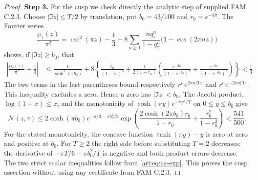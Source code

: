 \begin{proof}
\noindent\textbf{Step 3.} For the cusp we check directly the analytic step of supplied FAM C.2.3.
Choose $|\Im z|\le T/2$ by translation, put $b_0=43/100$ and
$r_0=e^{-4\pi}$. The Fourier series
\[
 \frac{\wp_\tau(z)}{\pi^2}
 =\csc^2(\pi z)-\frac13
   +8\sum_{n\ge1}\frac{nq_\tau^n}{1-q_\tau^n}
          \bigl(1-\cos(2\pi nz)\bigr)
\]
shows, if $|\Im z|\ge b_0$, that
\begin{align*}
 \left|\frac{\wp_\tau(z)}{\pi^2}+\frac13\right|
 &\le \frac1{\sinh^2(\pi b_0)}
 +8\left\{\frac{r_0}{(1-r_0)^3}
 +\frac1{2(1-r_0)}
 \left(\frac{e^{-2\pi}}{(1-e^{-2\pi})^2}
       +\frac{e^{-6\pi}}{(1-e^{-6\pi})^2}\right)\right\}
 <\frac13.
\end{align*}
The two terms in the last parentheses bound respectively
$r^n e^{2\pi n|\Im z|}$ and $r^n e^{-2\pi n|\Im z|}$.
This inequality excludes a zero. Hence a zero has
$|\Im z|<b_0$. The Jacobi product, $\log(1+x)\le x$, and
the monotonicity of $\cosh(\pi y)e^{-\pi y^2/T}$ on
$0\le y\le b_0$ give
\[
 \mathcal N(z,\tau)\le
 2\cosh(\pi b_0)e^{-\pi/3-\pi b_0^2/2}
 \exp\!\left(
 \frac{2\cosh(2\pi b_0)r_0}{1-r_0}
 +\frac{r_0^2}{1-r_0^2}\right)<\frac{541}{500}.
\]
For the stated monotonicity, the concave function
$\tanh(\pi y)-y$ is zero at zero and positive at $b_0$.
For $T\ge2$ the right side before substituting $T=2$ decreases:
the derivative of $-\pi T/6-\pi b_0^2/T$ is negative and
both product errors decrease. The two strict scalar inequalities
follow from \eqref{ari:eq:ca-exp}. This proves the cusp assertion
without using any certificate from FAM C.2.3.
\end{proof}

